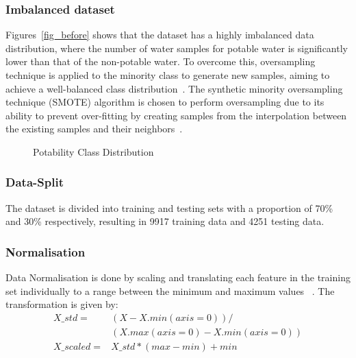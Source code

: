 \documentclass[conference]{IEEEtran}
\begin{document}
\subsubsection{Imbalanced dataset}
Figures~\ref{fig_before} shows that the dataset has a highly imbalanced data distribution, where the number of water samples for potable water is significantly lower than that of the non-potable water. To overcome this, oversampling technique is applied to the minority class to generate new samples, aiming to achieve a well-balanced class distribution~\cite{douzas2018improving}. The synthetic minority oversampling technique (SMOTE) algorithm is chosen to perform oversampling due to its ability to prevent over-fitting by creating samples from the interpolation between the existing samples and their neighbors~\cite{nasir2022water}.
\begin{figure}[htbp]
    \centering
    \caption{Potability Class Distribution} \label{fig_data_num}
\end{figure}

\subsubsection{Data-Split}
The dataset is divided into training and testing sets with a proportion of 70\% and 30\% respectively, resulting in 9917 training data and 4251 testing data.

\subsubsection{Normalisation}
Data Normalisation is done by scaling and translating each feature in the training set individually to a range between the minimum and maximum values ~\cite{scikit}. The transformation is given by:
\begin{align*}
X\_std = &(X - X.min(axis=0)) / \\
&(X.max(axis=0) - X.min(axis=0)) \\
X\_scaled = &X\_std * (max - min) + min
\end{align*}
\end{document}
